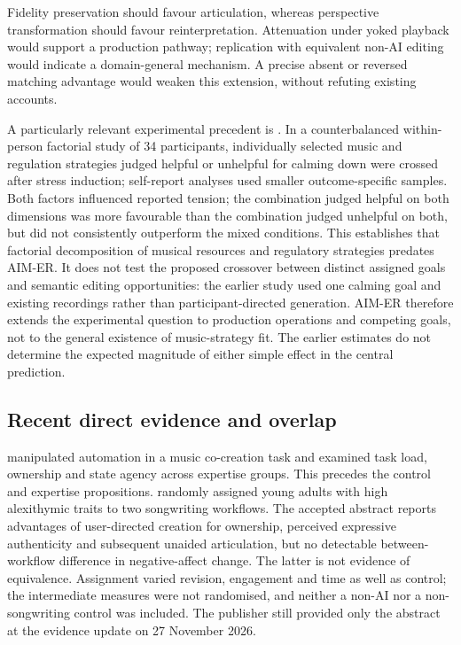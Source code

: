 Fidelity preservation should favour articulation, whereas perspective transformation should favour reinterpretation. Attenuation under yoked playback would support a production pathway; replication with equivalent non-AI editing would indicate a domain-general mechanism. A precise absent or reversed matching advantage would weaken this extension, without refuting existing accounts.

A particularly relevant experimental precedent is \citet{baltazarstress2019}. In a counterbalanced within-person factorial study of 34 participants, individually selected music and regulation strategies judged helpful or unhelpful for calming down were crossed after stress induction; self-report analyses used smaller outcome-specific samples. Both factors influenced reported tension; the combination judged helpful on both dimensions was more favourable than the combination judged unhelpful on both, but did not consistently outperform the mixed conditions. This establishes that factorial decomposition of musical resources and regulatory strategies predates AIM-ER. It does not test the proposed crossover between distinct assigned goals and semantic editing opportunities: the earlier study used one calming goal and existing recordings rather than participant-directed generation. AIM-ER therefore extends the experimental question to production operations and competing goals, not to the general existence of music-strategy fit. The earlier estimates do not determine the expected magnitude of either simple effect in the central prediction.

\subsection{Recent direct evidence and overlap}
\citet{he2026} manipulated automation in a music co-creation task and examined task load, ownership and state agency across expertise groups. This precedes the control and expertise propositions. \citet{zhang2026} randomly assigned young adults with high alexithymic traits to two songwriting workflows. The accepted abstract reports advantages of user-directed creation for ownership, perceived expressive authenticity and subsequent unaided articulation, but no detectable between-workflow difference in negative-affect change. The latter is not evidence of equivalence. Assignment varied revision, engagement and time as well as control; the intermediate measures were not randomised, and neither a non-AI nor a non-songwriting control was included. The publisher still provided only the abstract at the evidence update on 27 November 2026.

